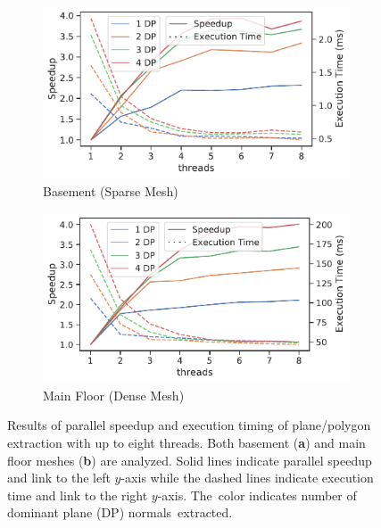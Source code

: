 \begin{figure}[H]
  \begin{subfigure}[t]{.49\linewidth}
    \centering\includegraphics[width=.95\linewidth]{chapter_3_polylidar3d/imgs/meshes/basement_speedup.pdf}
    \caption{\label{fig:ch3_mesh_parallel_a}Basement (Sparse Mesh)}
  \end{subfigure}
  \begin{subfigure}[t]{.49\linewidth}
    \centering\includegraphics[width=.95\linewidth]{chapter_3_polylidar3d/imgs/meshes/mainfloor_speedup.pdf}
    \caption{\label{fig:ch3_mesh_parallel_b}Main Floor (Dense Mesh)}
  \end{subfigure}
  \caption{Results of parallel speedup and execution timing of plane/polygon extraction with up to eight threads. Both basement (\textbf{a}) and main floor meshes (\textbf{b}) are analyzed. Solid lines indicate parallel speedup and link to the left $y$-axis while the dashed lines indicate execution time and link to the right $y$-axis. The~color indicates number of dominant plane (DP) normals~extracted.}\label{fig:ch3_mesh_parallel}
\end{figure}
\unskip



